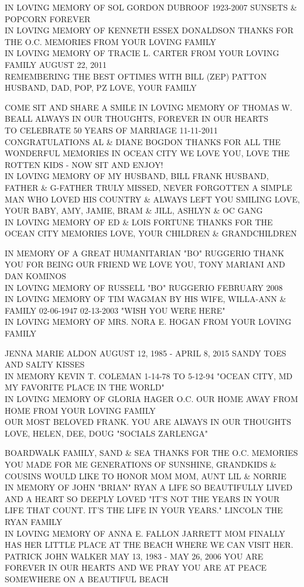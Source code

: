 \documentclass[10pt,letterpaper]{article}
\begin{document}
IN LOVING MEMORY OF SOL GORDON DUBROOF 1923{-}2007 SUNSETS \& POPCORN FOREVER\\
IN LOVING MEMORY OF KENNETH ESSEX DONALDSON THANKS FOR THE O.C. MEMORIES FROM YOUR LOVING FAMILY\\
IN LOVING MEMORY OF TRACIE L. CARTER FROM YOUR LOVING FAMILY AUGUST 22, 2011\\
REMEMBERING THE BEST OFTIMES WITH BILL (ZEP) PATTON HUSBAND, DAD, POP, PZ LOVE, YOUR FAMILY

COME SIT AND SHARE A SMILE IN LOVING MEMORY OF THOMAS W. BEALL ALWAYS IN OUR THOUGHTS, FOREVER IN OUR HEARTS\\
TO CELEBRATE 50 YEARS OF MARRIAGE 11{-}11{-}2011 CONGRATULATIONS AL \& DIANE BOGDON THANKS FOR ALL THE WONDERFUL MEMORIES IN OCEAN CITY WE LOVE YOU, LOVE THE ROTTEN KIDS {-} NOW SIT AND ENJOY!\\
IN LOVING MEMORY OF MY HUSBAND, BILL FRANK HUSBAND, FATHER \& G{-}FATHER TRULY MISSED, NEVER FORGOTTEN A SIMPLE MAN WHO LOVED HIS COUNTRY \& ALWAYS LEFT YOU SMILING LOVE, YOUR BABY, AMY, JAMIE, BRAM \& JILL, ASHLYN \& OC GANG\\
IN LOVING MEMORY OF ED \& LOIS FORTUNE THANKS FOR THE OCEAN CITY MEMORIES LOVE, YOUR CHILDREN \& GRANDCHILDREN

IN MEMORY OF A GREAT HUMANITARIAN "BO" RUGGERIO THANK YOU FOR BEING OUR FRIEND WE LOVE YOU, TONY MARIANI AND DAN KOMINOS\\
IN LOVING MEMORY OF RUSSELL "BO" RUGGERIO FEBRUARY 2008\\
IN LOVING MEMORY OF TIM WAGMAN BY HIS WIFE, WILLA{-}ANN \& FAMILY 02{-}06{-}1947 02{-}13{-}2003 "WISH YOU WERE HERE"\\
IN LOVING MEMORY OF MRS. NORA E. HOGAN FROM YOUR LOVING FAMILY

JENNA MARIE ALDON AUGUST 12, 1985 {-} APRIL 8, 2015 SANDY TOES AND SALTY KISSES\\
IN MEMORY KEVIN T. COLEMAN 1{-}14{-}78 TO 5{-}12{-}94 "OCEAN CITY, MD MY FAVORITE PLACE IN THE WORLD"\\
IN LOVING MEMORY OF GLORIA HAGER O.C. OUR HOME AWAY FROM HOME FROM YOUR LOVING FAMILY\\
OUR MOST BELOVED FRANK.  YOU ARE ALWAYS IN OUR THOUGHTS LOVE, HELEN, DEE, DOUG "SOCIALS ZARLENGA"

BOARDWALK FAMILY, SAND \& SEA THANKS FOR THE O.C. MEMORIES YOU MADE FOR ME GENERATIONS OF SUNSHINE, GRANDKIDS \& COUSINS WOULD LIKE TO HONOR MOM MOM, AUNT LIL \& NORRIE\\
IN MEMORY OF JOHN "BRIAN" RYAN A LIFE SO BEAUTIFULLY LIVED AND A HEART SO DEEPLY LOVED "IT'S NOT THE YEARS IN YOUR LIFE THAT COUNT.  IT'S THE LIFE IN YOUR YEARS."  LINCOLN THE RYAN FAMILY\\
IN LOVING MEMORY OF ANNA E. FALLON JARRETT MOM FINALLY HAS HER LITTLE PLACE AT THE BEACH WHERE WE CAN VISIT HER.\\
PATRICK JOHN WALKER MAY 13, 1983 {-} MAY 26, 2006 YOU ARE FOREVER IN OUR HEARTS AND WE PRAY YOU ARE AT PEACE SOMEWHERE ON A BEAUTIFUL BEACH
\end{document}
